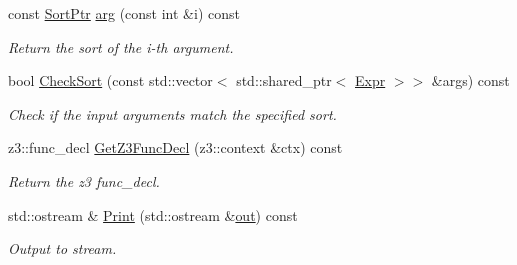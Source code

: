 \begin{DoxyCompactItemize}
\mbox{\label{classilang_1_1_func_abc7bc1fdb72e084ded515387a204b43a}} 
const \mbox{\hyperlink{namespaceilang_ae01073336878d60a231f4fe96d45ab55}{Sort\+Ptr}} \mbox{\hyperlink{classilang_1_1_func_abc7bc1fdb72e084ded515387a204b43a}{arg}} (const int \&i) const
\begin{DoxyCompactList}\small\item\em Return the sort of the i-\/th argument. \end{DoxyCompactList}\item 
\mbox{\label{classilang_1_1_func_a185ffddce2b7275341557fc895a77b35}} 
bool \mbox{\hyperlink{classilang_1_1_func_a185ffddce2b7275341557fc895a77b35}{Check\+Sort}} (const std\+::vector$<$ std\+::shared\+\_\+ptr$<$ \mbox{\hyperlink{classilang_1_1_expr}{Expr}} $>$$>$ \&args) const
\begin{DoxyCompactList}\small\item\em Check if the input arguments match the specified sort. \end{DoxyCompactList}\item 
\mbox{\label{classilang_1_1_func_adba48cab7424157b4580434f695e4145}} 
z3\+::func\+\_\+decl \mbox{\hyperlink{classilang_1_1_func_adba48cab7424157b4580434f695e4145}{Get\+Z3\+Func\+Decl}} (z3\+::context \&ctx) const
\begin{DoxyCompactList}\small\item\em Return the z3 func\+\_\+decl. \end{DoxyCompactList}\item 
\mbox{\label{classilang_1_1_func_a1ca9dd205142a4b3bfe5057de8545200}} 
std\+::ostream \& \mbox{\hyperlink{classilang_1_1_func_a1ca9dd205142a4b3bfe5057de8545200}{Print}} (std\+::ostream \&\mbox{\hyperlink{classilang_1_1_func_a58414a3455af0484ccfcce8401b02d37}{out}}) const
\begin{DoxyCompactList}\small\item\em Output to stream. \end{DoxyCompactList}\end{DoxyCompactItemize}
